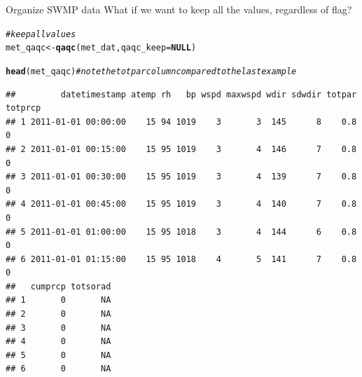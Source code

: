 \documentclass[xcolor=svgnames]{beamer}\usepackage[]{graphicx}\usepackage[]{color}
\makeatletter
\newcommand{\hlcom}[1]{\textcolor[rgb]{0.678,0.584,0.686}{\textit{#1}}}%
\newcommand{\hlstd}[1]{\textcolor[rgb]{0.345,0.345,0.345}{#1}}%
\newcommand{\hlkwa}[1]{\textcolor[rgb]{0.161,0.373,0.58}{\textbf{#1}}}%
\newcommand{\hlkwb}[1]{\textcolor[rgb]{0.69,0.353,0.396}{#1}}%
\newcommand{\hlkwc}[1]{\textcolor[rgb]{0.333,0.667,0.333}{#1}}%
\newcommand{\hlkwd}[1]{\textcolor[rgb]{0.737,0.353,0.396}{\textbf{#1}}}%
\newenvironment{kframe}{%
 \def\at@end@of@kframe{}%
 \ifinner\ifhmode%
  \def\at@end@of@kframe{\end{minipage}}%
  \begin{minipage}{\columnwidth}%
 \fi\fi%
 \def\FrameCommand##1{\hskip\@totalleftmargin \hskip-\fboxsep
 \colorbox{shadecolor}{##1}\hskip-\fboxsep
     \hskip-\linewidth \hskip-\@totalleftmargin \hskip\columnwidth}%
 \MakeFramed {\advance\hsize-\width
   \@totalleftmargin\z@ \linewidth\hsize
   \@setminipage}}%
 {\par\unskip\endMakeFramed%
 \at@end@of@kframe}
\newenvironment{knitrout}{}{} %
\makeatother
\begin{document}
\begin{frame}[containsverbatim]{Organize SWMP data}
What if we want to keep all the values, regardless of flag?
\begin{knitrout}\scriptsize
{}\color{fgcolor}\begin{kframe}
\begin{alltt}
\hlcom{# keep all values}
\hlstd{met_qaqc} \hlkwb{<-} \hlkwd{qaqc}\hlstd{(met_dat,} \hlkwc{qaqc_keep} \hlstd{=} \hlkwa{NULL}\hlstd{)}

\hlkwd{head}\hlstd{(met_qaqc)} \hlcom{# note the totpar column compared to the last example}
\end{alltt}
\begin{verbatim}
##         datetimestamp atemp rh   bp wspd maxwspd wdir sdwdir totpar totprcp
## 1 2011-01-01 00:00:00    15 94 1019    3       3  145      8    0.8       0
## 2 2011-01-01 00:15:00    15 95 1019    3       4  146      7    0.8       0
## 3 2011-01-01 00:30:00    15 95 1019    3       4  139      7    0.8       0
## 4 2011-01-01 00:45:00    15 95 1019    3       4  140      7    0.8       0
## 5 2011-01-01 01:00:00    15 95 1018    3       4  144      6    0.8       0
## 6 2011-01-01 01:15:00    15 95 1018    4       5  141      7    0.8       0
##   cumprcp totsorad
## 1       0       NA
## 2       0       NA
## 3       0       NA
## 4       0       NA
## 5       0       NA
## 6       0       NA
\end{verbatim}
\end{kframe}
\end{knitrout}
\end{frame}
\end{document}
